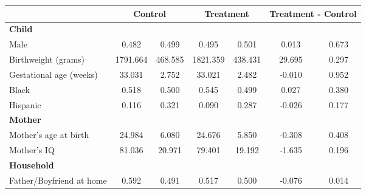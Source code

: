 \begin{tabular}{lcccccc}
\toprule
& \multicolumn{2}{c}{Control} & \multicolumn{2}{c}{Treatment} & \multicolumn{2}{c}{Treatment - Control} \\
\midrule
\textbf{Child} & & & & & & \\
\quad\quad Male & 0.482 & 0.499 & 0.495 & 0.501 & 0.013 & 0.673 \\
\quad\quad Birthweight (grams) & 1791.664 & 468.585 & 1821.359 & 438.431 & 29.695 & 0.297 \\
\quad\quad Gestational age (weeks) & 33.031 & 2.752 & 33.021 & 2.482 & -0.010 & 0.952 \\
\quad\quad Black & 0.518 & 0.500 & 0.545 & 0.499 & 0.027 & 0.380 \\
\quad\quad Hispanic & 0.116 & 0.321 & 0.090 & 0.287 & -0.026 & 0.177 \\
\textbf{Mother} & & & & & & \\
\quad\quad Mother's age at birth & 24.984 & 6.080 & 24.676 & 5.850 & -0.308 & 0.408 \\
\quad\quad Mother's IQ & 81.036 & 20.971 & 79.401 & 19.192 & -1.635 & 0.196 \\
\textbf{Household} & & & & & & \\
\quad\quad Father/Boyfriend at home & 0.592 & 0.491 & 0.517 & 0.500 & -0.076 & 0.014 \\
\bottomrule
\end{tabular}
